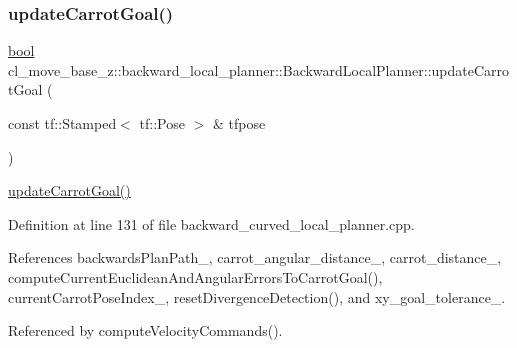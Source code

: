 \subsubsection{\texorpdfstring{update\+Carrot\+Goal()}{updateCarrotGoal()}}
{\footnotesize\ttfamily \hyperlink{classbool}{bool} cl\+\_\+move\+\_\+base\+\_\+z\+::backward\+\_\+local\+\_\+planner\+::\+Backward\+Local\+Planner\+::update\+Carrot\+Goal (\begin{DoxyParamCaption}\item[{const tf\+::\+Stamped$<$ tf\+::\+Pose $>$ \&}]{tfpose }\end{DoxyParamCaption})\hspace{0.3cm}{\ttfamily [private]}}

\hyperlink{classcl__move__base__z_1_1backward__local__planner_1_1BackwardLocalPlanner_a16e79a1b4c0f18879f6f0a8ba67103fd}{update\+Carrot\+Goal()} 

Definition at line 131 of file backward\+\_\+curved\+\_\+local\+\_\+planner.\+cpp.



References backwards\+Plan\+Path\+\_\+, carrot\+\_\+angular\+\_\+distance\+\_\+, carrot\+\_\+distance\+\_\+, compute\+Current\+Euclidean\+And\+Angular\+Errors\+To\+Carrot\+Goal(), current\+Carrot\+Pose\+Index\+\_\+, reset\+Divergence\+Detection(), and xy\+\_\+goal\+\_\+tolerance\+\_\+.



Referenced by compute\+Velocity\+Commands().


